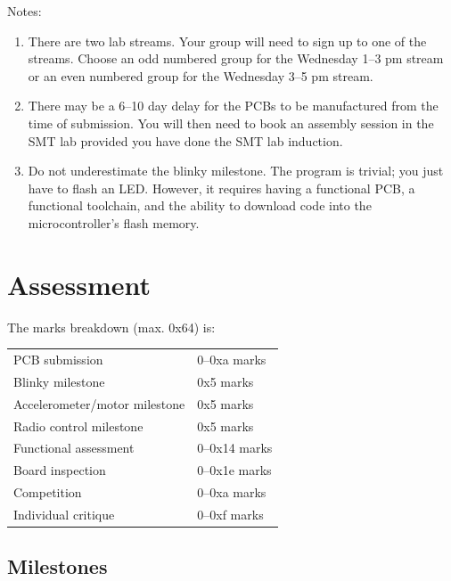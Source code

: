 \documentclass[11pt, a4paper]{article}
\begin{document}
Notes:
%
\begin{enumerate}
\item There are two lab streams.  Your group will need to sign up to
  one of the streams.  Choose an odd numbered group for the Wednesday
  1--3 pm stream or an even numbered group for the Wednesday 3--5 pm
  stream.

\item There may be a 6--10 day delay for the PCBs to be manufactured
  from the time of submission.  You will then need to book an assembly
  session in the SMT lab provided you have done the SMT lab induction.

\item Do not underestimate the blinky milestone.  The program is
  trivial; you just have to flash an LED.  However, it requires having
  a functional PCB, a functional toolchain, and the ability to
  download code into the microcontroller's flash memory.

\end{enumerate}


\section{Assessment}

The marks breakdown (max. 0x64) is:
%
\begin{flushleft}
  \begin{tabular}{ll}
    PCB submission & 0--0xa marks\\
    Blinky milestone  & 0x5 marks\\
    Accelerometer/motor milestone  & 0x5 marks\\
    Radio control milestone  & 0x5 marks\\
    Functional assessment & 0--0x14 marks \\
    Board inspection & 0--0x1e marks \\
    Competition & 0--0xa marks \\
    Individual critique & 0--0xf marks \\
  \end{tabular}

\end{flushleft}

\subsection{Milestones}
\end{document}
